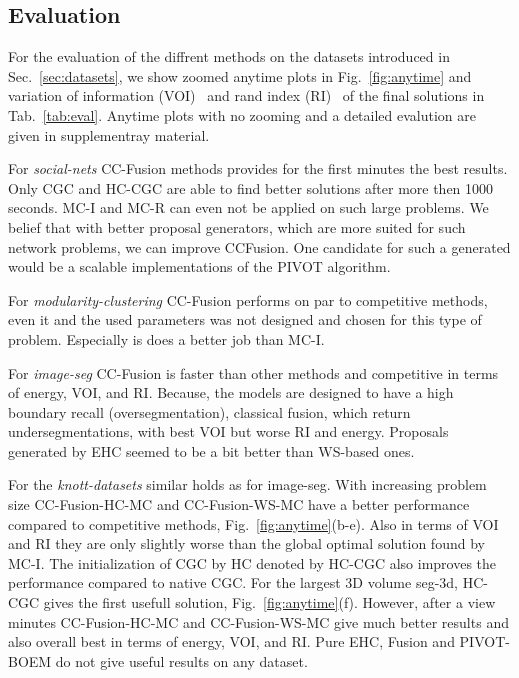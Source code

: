 \subsection{Evaluation}
For the evaluation of the diffrent methods on the datasets introduced in Sec.~\ref{sec:datasets},
we show zoomed anytime plots in  Fig.~\ref{fig:anytime} and variation of information (VOI)~\cite{meila-2003}
and rand index (RI)~\cite{rand-1971} of the final solutions in Tab.~\ref{tab:eval}.
Anytime plots with no zooming and a detailed evalution are given in supplementray material. 


For \emph{social-nets} CC-Fusion methods provides for the first minutes the best results.
Only CGC and HC-CGC are able to find better solutions after more then 1000 seconds.
MC-I and MC-R can even not be applied on such large problems.
We belief that with better proposal generators, which are more suited for such network problems,
we can improve CCFusion. One candidate for such a generated would be a scalable implementations of the 
PIVOT algorithm.

For \emph{modularity-clustering} CC-Fusion performs on par to competitive methods, even it 
and the used parameters was not designed and chosen for this type of problem.
Especially is does a better job than MC-I.

For \emph{image-seg} CC-Fusion is faster than other methods and competitive in terms of energy, VOI, and RI.
Because, the models are designed to have a high boundary recall (oversegmentation), 
classical fusion, which return undersegmentations, with best VOI but worse RI and energy.
Proposals generated by EHC seemed to be a bit better than WS-based ones.

For the \emph{knott-datasets} similar holds as for image-seg. 
With increasing problem size CC-Fusion-HC-MC and CC-Fusion-WS-MC have a better performance compared to competitive methods, \cf Fig.~\ref{fig:anytime}(b-e).
Also in terms of VOI and RI they are only slightly worse than the global optimal solution found by MC-I.
The initialization of CGC by HC denoted by HC-CGC also improves the performance compared to native CGC.
For the largest 3D volume seg-3d, HC-CGC gives the first usefull solution, \cf  Fig.~\ref{fig:anytime}(f).
However, after a view minutes  CC-Fusion-HC-MC and CC-Fusion-WS-MC give much better results and also overall best in terms of energy, VOI, and RI.
%
Pure EHC, Fusion and PIVOT-BOEM do not give useful results on any dataset.
